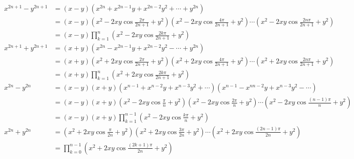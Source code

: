 \begin{align*}
  x^{2n+1}-y^{2n+1}&=(x-y)(x^{2n}+x^{2n-1}y+x^{2n-2}y^{2}+\cdots+y^{2n}) \\
    &=(x-y)\left(x^{2}-2xy\cos \frac{2\pi}{2n+1}+y^{2}\right)\left(x^{2}-2xy\cos \frac{4\pi}{2n+1}+y^{2}\right)\cdots\left(x^{2}-2xy\cos \frac{2n\pi}{2n+1}+y^{2}\right) \\
    &=(x-y)\prod_{k=1}^{n}\left(x^{2}-2xy\cos \frac{2k\pi}{2n+1}+y^{2}\right) \\
  x^{2n+1}+y^{2n+1}&=(x+y)(x^{2n}-x^{2n-1}y+x^{2n-2}y^{2}-\cdots+y^{2n}) \\
    &=(x+y)\left(x^{2}+2xy\cos \frac{2\pi}{2n+1}+y^{2}\right)\left(x^{2}+2xy\cos \frac{4\pi}{2n+1}+y^{2}\right)\cdots\left(x^{2}+2xy\cos \frac{2n\pi}{2n+1}+y^{2}\right) \\
    &=(x+y)\prod_{k=1}^{n}\left(x^{2}+2xy\cos \frac{2k\pi}{2n+1}+y^{2}\right) \\
  x^{2n}-y^{2n}&=(x-y)(x+y)(x^{n-1}+x^{n-2}y+x^{n-3}y^{2}+\cdots)(x^{n-1}-x^{n  n-2}y+x^{n-3}y^{2}-\cdots) \\
    &=(x-y)(x+y)\left(x^{2}-2xy\cos \frac{\pi}{n}+y^{2}\right)\left(x^{2}-2xy\cos \frac{2\pi}{n}+y^{2}\right)\cdots\left(x^{2}-2xy\cos \frac{(n-1)\pi}{n}+y^{2}\right)\\
    &=(x-y)(x+y)\prod_{k=1}^{n-1}\left(x^{2}-2xy\cos \frac{k\pi}{n}+y^{2}\right)\\
  x^{2n}+y^{2n}&=\left(x^{2}+2xy\cos \frac{\pi}{2n}+y^{2}\right)\left(x^{2}+2xy\cos           \frac{3\pi}{2n}+y^{2}\right)\cdots\left(x^{2}+2xy\cos \frac{(2n-1)\pi}{2n}+y^{2}\right) \\
  &=\prod_{k=0}^{n-1}\left(x^{2}+2xy\cos \frac{(2k+1)\pi}{2n}+y^{2}\right)
\end{align*}
